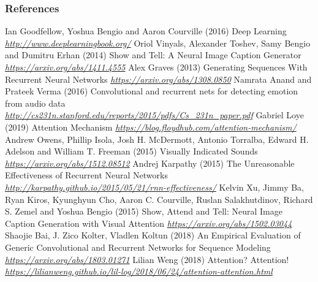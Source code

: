 \documentclass[11pt,compress,t,notes=noshow]{beamer}
\newenvironment{vbframe}  %
{
 \begin{frame}[containsverbatim,allowframebreaks]
}
{
\end{frame}
}
\begin{document}
\begin{vbframe}
\frametitle{References}
\footnotesize{
\begin{thebibliography}{99}
 Ian Goodfellow, Yoshua Bengio and Aaron Courville (2016)
\newblock Deep Learning
\newblock \emph{\url{http://www.deeplearningbook.org/}}
 Oriol Vinyals, Alexander Toshev, Samy Bengio and Dumitru Erhan (2014)
\newblock Show and Tell: A Neural Image Caption Generator
\newblock \emph{\url{https://arxiv.org/abs/1411.4555}}
 Alex Graves (2013)
\newblock Generating Sequences With Recurrent Neural Networks
\newblock \emph{\url{https://arxiv.org/abs/1308.0850}}
 Namrata Anand and Prateek Verma (2016)
\newblock Convolutional and recurrent nets for detecting emotion from audio data
\newblock \emph{\url{http://cs231n.stanford.edu/reports/2015/pdfs/Cs_231n_paper.pdf}}
 Gabriel Loye (2019)
\newblock Attention Mechanism
\newblock \emph{\url{https://blog.floydhub.com/attention-mechanism/}}
 Andrew Owens, Phillip Isola, Josh H. McDermott, Antonio Torralba, Edward H. Adelson and  William T. Freeman (2015)
\newblock Visually Indicated Sounds
\newblock \emph{\url{https://arxiv.org/abs/1512.08512}}
 Andrej Karpathy (2015)
\newblock The Unreasonable Effectiveness of Recurrent Neural Networks
\newblock \emph{\url{http://karpathy.github.io/2015/05/21/rnn-effectiveness/}}
 Kelvin Xu, Jimmy Ba, Ryan Kiros, Kyunghyun Cho, Aaron C. Courville, Ruslan Salakhutdinov, Richard S. Zemel and  Yoshua Bengio (2015)
\newblock Show, Attend and Tell: Neural Image Caption Generation with Visual Attention
\newblock \emph{\url{https://arxiv.org/abs/1502.03044}}
 Shaojie Bai, J. Zico Kolter, Vladlen Koltun (2018)
\newblock An Empirical Evaluation of Generic Convolutional and Recurrent Networks for Sequence Modeling
\newblock \emph{\url{https://arxiv.org/abs/1803.01271}}
 Lilian Weng (2018)
\newblock Attention? Attention!
\newblock \emph{\url{https://lilianweng.github.io/lil-log/2018/06/24/attention-attention.html}}
\end{thebibliography}
}
\end{vbframe}

\endlecture
\end{document}

